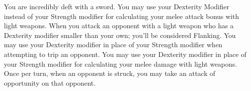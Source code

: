 \combatfeat
{You are incredibly deft with a sword.}
{You may use your Dexterity Modifier instead of your Strength modifier for calculating your melee attack bonus with light weapons.}
{When you attack an opponent with a light weapon who has a Dexterity modifier smaller than your own; you'll be considered Flanking.}
{You may use your Dexterity modifier in place of your Strength modifier when attempting to trip an opponent.}
{You may use your Dexterity modifier in place of your Strength modifier for calculating your melee damage with light weapons.}
{Once per turn, when an opponent is struck, you may take an attack of opportunity on that opponent.}